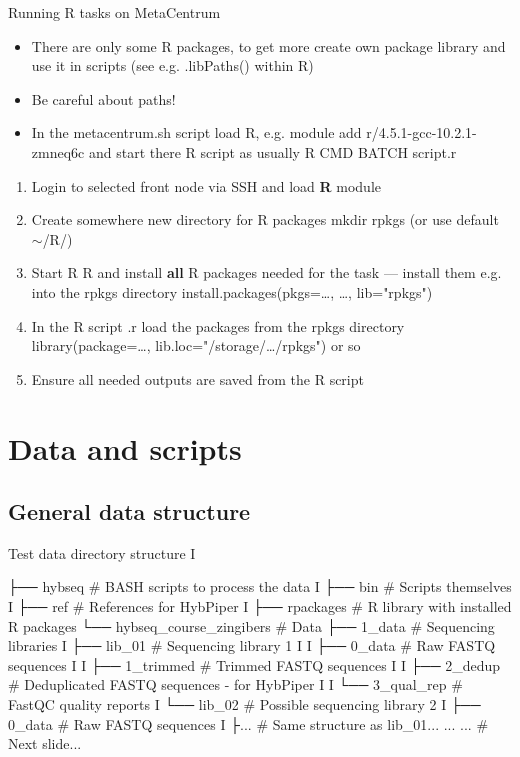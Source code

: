 \documentclass[compress,  xelatex, 11pt, xcolor=x11names, aspectratio=169,
	hyperref={
		bookmarks=true,
		unicode=true,
		colorlinks=true,
		pdftitle={HybSeq course},
		plainpages=false,
		pdfauthor={Vojtech Zeisek},
		pdfsubject={Practical processing of HybSeq target enrichment sequencing data on computing grids like MetaCentrum},
		pdfcreator={XeLaTeX},
		pdfkeywords={BASH, command line, GNU, HybSeq, Linux, MetaCentrum, sequencing shell, target enrichment},
		linkcolor=Turquoise4, %
		anchorcolor=DodgerBlue4, %
		citecolor=DodgerBlue4, %
		filecolor=DodgerBlue4, %
		menucolor=Tan4, %
		urlcolor=DarkOliveGreen4 %
		},
	url={hyphens, lowtilde} %
	]{beamer}
\renewcommand{\texttt}[1]{\colorbox{Cornsilk2}{{\ttfamily #1}}}
\renewcommand{\alert}[1]{\textcolor{OrangeRed3}{#1}}
\begin{document}
\begin{frame}{Running R tasks on MetaCentrum}
	\begin{itemize}
		\item There are only some R packages, to get more create own package library and use it in scripts (see e.g. \texttt{.libPaths()} within \texttt{R})
		\item \alert{Be careful about paths!}
		\item In the \texttt{metacentrum.sh} script load R, e.g. \texttt{module add r/4.5.1-gcc-10.2.1-zmneq6c} and start there R script as usually \texttt{R CMD BATCH script.r}
	\end{itemize}
	\begin{enumerate}
		\item Login to selected front node via SSH and load \textbf{R} module
		\item Create somewhere new directory for R packages \texttt{mkdir rpkgs} (or use default \texttt{$\sim$/R/})
		\item Start R \texttt{R} and install \textbf{all} R packages needed for the task --- install them e.g. into the \texttt{rpkgs} directory \texttt{install.packages(pkgs=\ldots, \ldots, lib="rpkgs")}
		\item In the R script \texttt{*.r} load the packages from the \texttt{rpkgs} directory \texttt{library(package=\ldots, lib.loc="/storage/\ldots/rpkgs")} or so
		\item Ensure all needed outputs are saved from the R script
	\end{enumerate}
\end{frame}

\section{Data and scripts}

\subsection{General data structure}

\begin{frame}[fragile]{Test data directory structure I}
	\label{datastructure}
	\begin{bashcode}
    ├── hybseq # BASH scripts to process the data
    I   ├── bin # Scripts themselves
    I   ├── ref # References for HybPiper
    I   ├── rpackages # R library with installed R packages
    └── hybseq_course_zingibers # Data
        ├── 1_data # Sequencing libraries
        I   ├── lib_01 # Sequencing library 1
        I   I   ├── 0_data # Raw FASTQ sequences
        I   I   ├── 1_trimmed # Trimmed FASTQ sequences
        I   I   ├── 2_dedup # Deduplicated FASTQ sequences - for HybPiper
        I   I   └── 3_qual_rep # FastQC quality reports
        I   └── lib_02 # Possible sequencing library 2
        I       ├── 0_data # Raw FASTQ sequences
        I       ├... # Same structure as lib_01...
        ...     ... # Next slide...
	\end{bashcode}
\end{frame}
\end{document}
